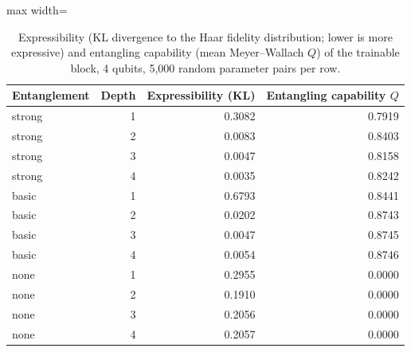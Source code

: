 \begin{table}[htbp]
\centering
\small
\caption{Expressibility (KL divergence to the Haar fidelity distribution; lower is more expressive) and entangling capability (mean Meyer--Wallach $Q$) of the trainable block, 4 qubits, 5,000 random parameter pairs per row.}
\label{tab:expressibility}
\begin{adjustbox}{max width=\linewidth}
\begin{tabular}{lrrr}
\toprule
Entanglement & Depth & Expressibility (KL) & Entangling capability $Q$ \\
\midrule
strong & 1 & 0.3082 & 0.7919 \\
strong & 2 & 0.0083 & 0.8403 \\
strong & 3 & 0.0047 & 0.8158 \\
strong & 4 & 0.0035 & 0.8242 \\
basic & 1 & 0.6793 & 0.8441 \\
basic & 2 & 0.0202 & 0.8743 \\
basic & 3 & 0.0047 & 0.8745 \\
basic & 4 & 0.0054 & 0.8746 \\
none & 1 & 0.2955 & 0.0000 \\
none & 2 & 0.1910 & 0.0000 \\
none & 3 & 0.2056 & 0.0000 \\
none & 4 & 0.2057 & 0.0000 \\
\bottomrule
\end{tabular}
\end{adjustbox}
\end{table}
